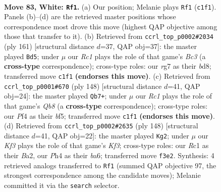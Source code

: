 \documentclass[11pt]{article}
\begin{document}
\clearpage

\begin{figure}[p]\centering
\begin{subfigure}{0.46\textwidth}\centering
\resizebox{\linewidth}{!}{%
\newchessgame
\chessboard[
  setfen={8/3k2r1/p7/Ppp2p1p/2p2P1P/4PKP1/1P6/2R5 w - - 11 83},
  showmover=false,
  pgfstyle=straightmove, color=movearrow, markmove={c1-f1}
]}
\caption{}
\end{subfigure}\hfill
\begin{subfigure}{0.46\textwidth}\centering
\resizebox{\linewidth}{!}{%
\newchessgame
\chessboard[
  setfen={3B4/8/2b5/1p4pk/p4p1p/P4P1P/1P4P1/6K1 b - - 7 81},
  showmover=false,
  pgfstyle=straightmove, color=movearrow, markmove={c6-d5}
]}
\caption{}
\end{subfigure}
\\[4pt]
\begin{subfigure}{0.46\textwidth}\centering
\resizebox{\linewidth}{!}{%
\newchessgame
\chessboard[
  setfen={1Q6/6k1/1p3p2/p1p2bp1/P1P5/KP3P1p/3r3P/8 w - - 6 75},
  showmover=false,
  pgfstyle=straightmove, color=movearrow, markmove={b8-b7}
]}
\caption{}
\end{subfigure}\hfill
\begin{subfigure}{0.46\textwidth}\centering
\resizebox{\linewidth}{!}{%
\newchessgame
\chessboard[
  setfen={8/8/b1P1p1k1/1p1p1p2/1P1P1P2/p3PK1P/B7/8 w - - 6 75},
  showmover=false,
  pgfstyle=straightmove, color=movearrow, markmove={f3-g2}
]}
\caption{}
\end{subfigure}
\caption{\textbf{Move 83, White: \texttt{Rf1}.} (a) Our position; Melanie plays \texttt{Rf1} (\texttt{c1f1}). Panels (b)--(d) are the retrieved master positions whose correspondence most drove this move (highest QAP objective among those that transfer to it). (b) Retrieved from \texttt{ccrl\_top\_p0002\#2034} (ply 161) [structural distance $d$=37, QAP obj=37]: the master played \texttt{Bd5}; under $\mu$ our \emph{Rc1} plays the role of that game's \emph{Bc3} (a \textbf{cross-type} correspondence); cross-type roles: our \emph{r}g7 as their \emph{b}d8; transferred move \texttt{c1f1} \textbf{(endorses this move)}. (c) Retrieved from \texttt{ccrl\_top\_p0001\#670} (ply 148) [structural distance $d$=41, QAP obj=24]: the master played \texttt{Qb7+}; under $\mu$ our \emph{Rc1} plays the role of that game's \emph{Qb8} (a \textbf{cross-type} correspondence); cross-type roles: our \emph{P}f4 as their \emph{b}f5; transferred move \texttt{c1f1} \textbf{(endorses this move)}. (d) Retrieved from \texttt{ccrl\_top\_p0002\#2635} (ply 148) [structural distance $d$=41, QAP obj=22]: the master played \texttt{Kg2}; under $\mu$ our \emph{Kf3} plays the role of that game's \emph{Kf3}; cross-type roles: our \emph{R}c1 as their \emph{B}a2, our \emph{P}h4 as their \emph{b}a6; transferred move \texttt{f3e2}. Synthesis: 4 retrieved analogs transferred to \texttt{Rf1} (summed QAP objective 97, the strongest correspondence among the candidate moves); Melanie committed it via the \texttt{search} selector.}
\label{fig:thought-m164}
\end{figure}
\end{document}
